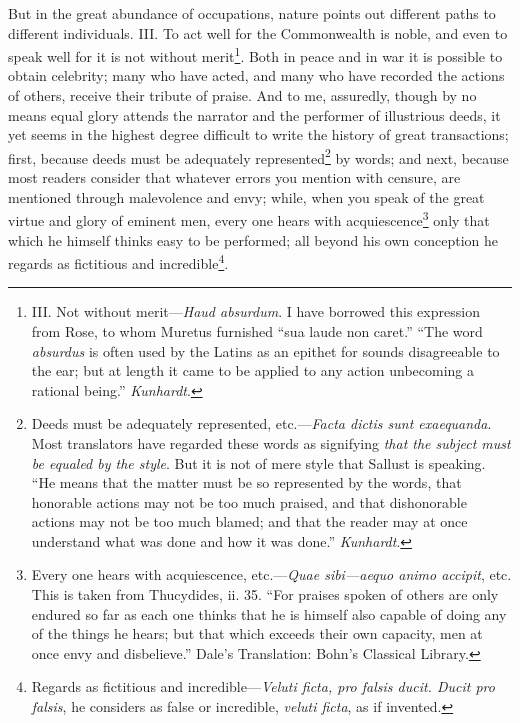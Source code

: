 But in the great abundance of occupations, nature points out different
paths to different individuals. III. To act well for the Commonwealth
is noble, and even to speak well for it is not without merit\footnote{III. Not without merit—\emph{Haud absurdum}. I have borrowed
this expression from Rose, to whom Muretus furnished ``sua laude non
caret.'' ``The word \emph{absurdus} is often used by the Latins as an epithet
for sounds disagreeable to the ear; but at length it came to be
applied to any action unbecoming a rational being.'' \emph{Kunhardt}.}. Both
in peace and in war it is possible to obtain celebrity; many who have
acted, and many who have recorded the actions of others, receive their
tribute of praise. And to me, assuredly, though by no means equal
glory attends the narrator and the performer of illustrious deeds, it
yet seems in the highest degree difficult to write the history of
great transactions; first, because deeds must be adequately
represented\footnote{Deeds must be adequately represented, etc.—\emph{Facta dictis
sunt exaequanda}. Most translators have regarded these words as
signifying \emph{that the subject must be equaled by the style}. But it is
not of mere style that Sallust is speaking. ``He means that the matter
must be so represented by the words, that honorable actions may not be
too much praised, and that dishonorable actions may not be too much
blamed; and that the reader may at once understand what was done and
how it was done.'' \emph{Kunhardt}.} by words; and next, because most readers consider that
whatever errors you mention with censure, are mentioned through
malevolence and envy; while, when you speak of the great virtue and
glory of eminent men, every one hears with acquiescence\footnote{Every one hears with acquiescence, etc.—\emph{Quae sibi—aequo
animo accipit}, etc. This is taken from Thucydides, ii. 35. ``For
praises spoken of others are only endured so far as each one thinks
that he is himself also capable of doing any of the things he hears;
but that which exceeds their own capacity, men at once envy and
disbelieve.'' Dale's Translation: Bohn's Classical Library.} only that
which he himself thinks easy to be performed; all beyond his own
conception he regards as fictitious and incredible\footnote{Regards as fictitious and incredible—\emph{Veluti ficta, pro
falsis ducit. Ducit pro falsis}, he considers as false or incredible,
\emph{veluti ficta}, as if invented.}.

